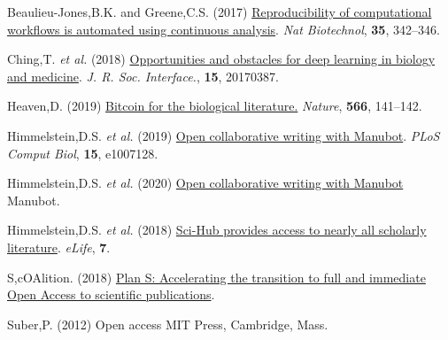 \hypertarget{refs}{}
\begin{CSLReferences}{1}{0}
\leavevmode{}%
Beaulieu-Jones,B.K. and Greene,C.S. (2017) \href{https://doi.org/10.1038/nbt.3780}{Reproducibility of computational workflows is automated using continuous analysis}. \emph{Nat Biotechnol}, \textbf{35}, 342--346.

\leavevmode{}%
Ching,T. \emph{et al.} (2018) \href{https://doi.org/10.1098/rsif.2017.0387}{Opportunities and obstacles for deep learning in biology and medicine}. \emph{J. R. Soc. Interface.}, \textbf{15}, 20170387.

\leavevmode{}%
Heaven,D. (2019) \href{https://doi.org/10.1038/d41586-019-00447-9}{Bitcoin for the biological literature.} \emph{Nature}, \textbf{566}, 141--142.

\leavevmode{}%
Himmelstein,D.S. \emph{et al.} (2019) \href{https://doi.org/10.1371/journal.pcbi.1007128}{Open collaborative writing with Manubot}. \emph{PLoS Comput Biol}, \textbf{15}, e1007128.

\leavevmode{}%
Himmelstein,D.S. \emph{et al.} (2020) \href{https://greenelab.github.io/meta-review/}{Open collaborative writing with Manubot} Manubot.

\leavevmode{}%
Himmelstein,D.S. \emph{et al.} (2018) \href{https://doi.org/10.7554/elife.32822}{Sci-Hub provides access to nearly all scholarly literature}. \emph{eLife}, \textbf{7}.

\leavevmode{}%
S,cOAlition. (2018) \href{https://www.wikidata.org/wiki/Q56458321}{Plan S: Accelerating the transition to full and immediate Open Access to scientific publications}.

\leavevmode{}%
Suber,P. (2012) Open access MIT Press, Cambridge, Mass.

\end{CSLReferences}
